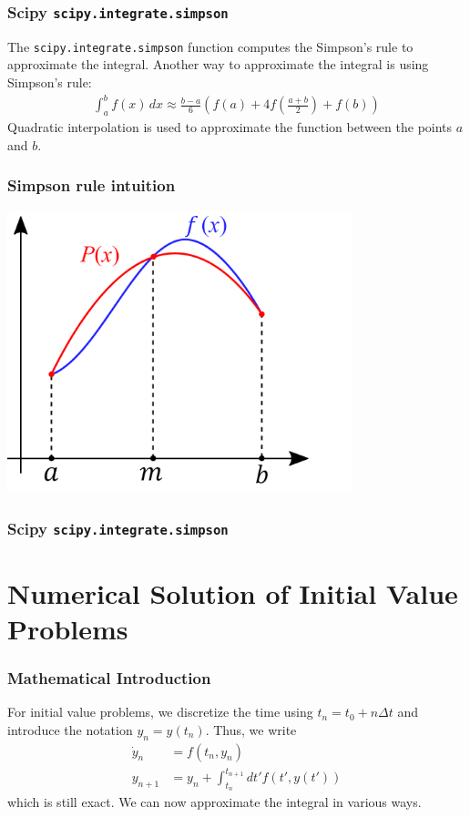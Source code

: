 \documentclass{beamer}
\begin{document}
\begin{frame}
  \frametitle{Scipy \texttt{scipy.integrate.simpson}}
  The \texttt{scipy.integrate.simpson} function computes the Simpson's rule to approximate the integral.
    \vspace{5mm}
    Another way to approximate the integral is using Simpson's rule:
    \begin{align*}
        \int_{a}^{b} f(x) \, dx \approx \frac{b - a}{6} \left( f(a) + 4f\left(\frac{a+b}{2}\right) + f(b) \right)
    \end{align*}
    Quadratic interpolation is used to approximate the function between the points \( a \) and \( b \).
\end{frame}
\begin{frame}
    \frametitle{Simpson rule intuition}
    \vspace{-5mm}
    \begin{center}
        \includegraphics[width=0.75\textwidth]{examples/fig/simpson.png}
    \end{center}
    

\end{frame}
\begin{frame}
  \frametitle{Scipy \texttt{scipy.integrate.simpson}}
  
\end{frame}

\section{Numerical Solution of Initial Value Problems}

\begin{frame}
  \frametitle{Mathematical Introduction}
  For initial value problems, we discretize the time using $t_n = t_0 + n \Delta t$ and introduce the notation $y_n = y(t_n)$. Thus, we write
  \begin{align*}
    \dot{y}_n &= f(t_n, y_n) \\
    y_{n + 1} &= y_n + \int_{t_n}^{t_{n+1}}dt' f(t', y(t'))
  \end{align*}
  which is still exact. We can now approximate the integral in various ways.
\end{frame}
\end{document}
